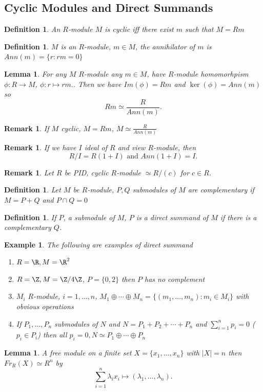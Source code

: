 \documentclass[a4paper,12pt]{article}
\newtheorem{lem}[thm]{Lemma}
\newtheorem{defn}[thm]{Definition}
\newtheorem{eg}[thm]{Example}
\newtheorem{rmk}[thm]{Remark}
\begin{document}
\subsection{Cyclic Modules and Direct Summands}
\begin{defn}
    An $R$-module $M$ is cyclic iff there exist $m$ such that $M=Rm$
\end{defn}
\begin{defn}
    $M$ is an $R$-module, $m\in M$, the annihilator of $m$ is $Ann(m)= \{r:rm=0\}$
\end{defn}
\begin{lem}
    For any $M$ $R$-module any $m\in M$, have $R$-module homomorhpism $\phi:R\to M$, $\phi:r\mapsto rm.$. Then we have $Im(\phi)=Rm$ and $\ker(\phi)=Ann(m)$ so 
    \[
    Rm\simeq \frac{R}{Ann(m)}
    .\] 
\end{lem}
\begin{rmk}
    If $M$ cyclic, $M=Rm$, $M\simeq \frac{R}{Ann(m)}$
\end{rmk}
\begin{rmk}
    If we have $I$ ideal of $R$ and view $R$-module, then 
    \[
    R/I=R(1+I) \text{ and } Ann(1+I)=I
    .\] 
\end{rmk}
\begin{rmk}
    Let $R$ be PID, cyclic $R$-module $\simeq R/(c)$ for $c\in R$. 
\end{rmk}
\begin{defn}
    Let $M$ be $R$-module, $P,Q$ submodules of $M$ are complementary if $M=P+Q$ and $P\cap Q= 0$
\end{defn}
\begin{defn}
    If $P$, a submodule of $M$, $P$ is a direct summand of $M$ if there is a complementary $Q$. 
\end{defn}
\begin{eg}
    The following are examples of direct summand
    \begin{enumerate}
        \item $R=\R,M=\R^2$
        \item $R=\Z, M=\Z/4\Z$, $P= \{0,2\}$ then $P$ has no complement
        \item $M_i$ $R$-module, $i=1,...,n$, $M_1\oplus \cdots \oplus M_n= \{(m_1,...,m_n): m_i\in M_i\}$ with obvious operations
        \item If $P_1,...,P_n$ submodules of $N$ and $N=P_1+P_2+\cdots+P_n$ and $\sum_{i=1}^n p_i=0$ ($p_i\in P_i$) then all $p_i=0, N\simeq P_1\oplus \cdots \oplus P_n$ 
    \end{enumerate}
\end{eg}
\begin{lem}
    A free module on a finite set $X= \{x_1,...,x_n\}$ with $|X|=n$ then $Fr_R(X)\simeq R^n$ by 
    \[
    \sum_{i=1}^n \lambda_i x_i\mapsto (\lambda_1,...,\lambda_n)
    .\] 
\end{lem}
\end{document}
